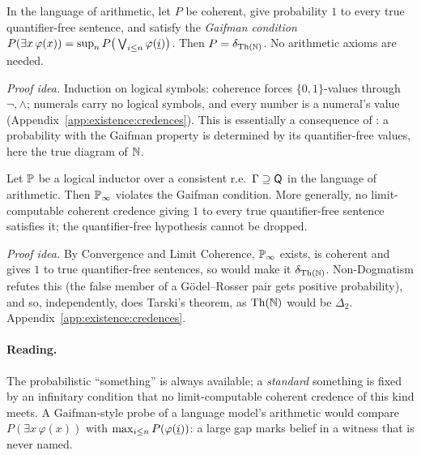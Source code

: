 \begin{theorem}\label{thm:existence:omega}
In the language of arithmetic, let $P$ be coherent, give probability $1$ to every true quantifier-free sentence, and satisfy the \emph{Gaifman condition} $P(\exists x\,\varphi(x))=\sup_nP\big(\bigvee_{i\le n}\varphi(\underline{i})\big)$. Then $P=\delta_{\mathrm{Th}(\mathbb{N})}$. No arithmetic axioms are needed.
\end{theorem}

\emph{Proof idea.} Induction on logical symbols: coherence forces $\{0,1\}$-values through $\neg,\wedge$; numerals carry no logical symbols, and every number is a numeral's value (Appendix~\ref{app:existence:credences}). This is essentially a consequence of \citet{gaifman1964concerning}: a probability with the Gaifman property is determined by its quantifier-free values, here the true diagram of $\mathbb{N}$.

\begin{corollary}\label{cor:existence:inductors}
Let $\mathbb{P}$ be a logical inductor \citep{garrabrant2016logical} over a consistent r.e.\ $\Gamma\supseteq\mathsf{Q}$ in the language of arithmetic. Then $\mathbb{P}_\infty$ violates the Gaifman condition. More generally, no limit-computable coherent credence giving $1$ to every true quantifier-free sentence satisfies it; the quantifier-free hypothesis cannot be dropped.
\end{corollary}

\emph{Proof idea.} By Convergence and Limit Coherence, $\mathbb{P}_\infty$ exists, is coherent and gives $1$ to true quantifier-free sentences, so  would make it $\delta_{\mathrm{Th}(\mathbb{N})}$. Non-Dogmatism refutes this (the false member of a G\"odel--Rosser pair gets positive probability), and so, independently, does Tarski's theorem, as $\mathrm{Th}(\mathbb{N})$ would be $\Delta_2$. Appendix~\ref{app:existence:credences}.

\paragraph{Reading.} The probabilistic ``something'' is always available; a \emph{standard} something is fixed by an infinitary condition that no limit-computable coherent credence of this kind meets. A Gaifman-style probe of a language model's arithmetic would compare $P(\exists x\,\varphi(x))$ with $\max_{i\le n}P(\varphi(\underline{i}))$: a large gap marks belief in a witness that is never named.

